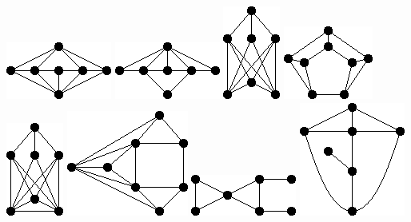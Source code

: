 \documentclass[11pt,paper=b5,footinclude,headinclude]{scrbook} %
\begin{document}
{\includegraphics[scale=0.5,frame]{smallGraphs/g_X106.png}     
\includegraphics[scale=0.5,frame]{smallGraphs/g_X107.png}     
\includegraphics[scale=0.5,frame]{smallGraphs/g_X11.png}     
\includegraphics[scale=0.5,frame]{smallGraphs/g_X111.png}     
\includegraphics[scale=0.5,frame]{smallGraphs/g_X12.png}     
\includegraphics[scale=0.5,frame]{smallGraphs/g_X120.png}     
\includegraphics[scale=0.5,frame]{smallGraphs/g_X127.png}     
\includegraphics[scale=0.5,frame]{smallGraphs/g_X13.png}     
}
\end{document}
